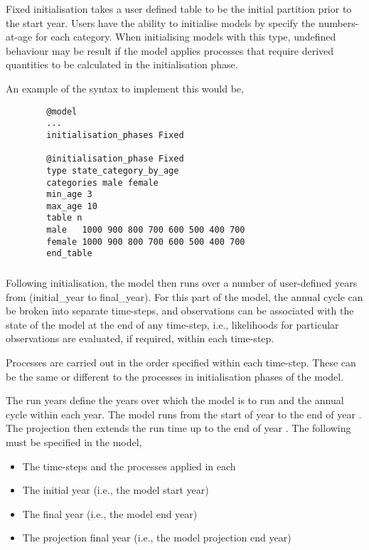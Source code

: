 Fixed initialisation takes a user defined table to be the initial partition prior to the start year. Users have the ability to initialise models by specify the numbers-at-age for each category. When initialising models with this type, undefined behaviour may be result if the model applies processes that require derived quantities to be calculated in the initialisation phase.

An example of the syntax to implement this would be,
{\small{\begin{verbatim}
		@model
		...
		initialisation_phases Fixed
		
		@initialisation_phase Fixed
		type state_category_by_age
		categories male female
		min_age 3
		max_age 10
		table n
		male   1000 900 800 700 600 500 400 700
		female 1000 900 800 700 600 500 400 700
		end_table
		\end{verbatim}}}

\subsubsection{}

Following initialisation, the model then runs over a number of user-defined years from (initial\_year to final\_year). For this part of the model, the annual cycle can be broken into separate time-steps, and observations can be associated with the state of the model at the end of any time-step, i.e., likelihoods for particular observations are evaluated, if required, within each time-step. 

Processes are carried out in the order specified within each time-step. These can be the same or different to the processes in initialisation phases of the model. 

The run years define the years over which the model is to run and the annual cycle within each year. The model runs from the start of year  to the end of year . The projection then extends the run time up to the end of year . The following must be specified in the model,
\begin{itemize}
  \item The time-steps and the processes applied in each
  \item The initial year (i.e., the model start year)
  \item The final year (i.e., the model end year)
  \item The projection final year (i.e., the model projection end year)
\end{itemize}

